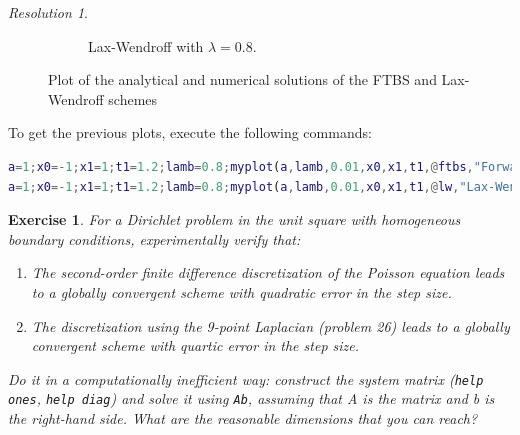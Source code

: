 \documentclass[10pt,a4paper]{article}
\newtheorem{exercici}{Exercise}
\theoremstyle{definition}
\theoremstyle{remark}
\newtheorem*{res}{Resolution}
\begin{document}
\begin{res}
\begin{figure}[!ht]
\begin{subfigure}{0.49\textwidth}
      \caption{Lax-Wendroff with $\lambda=0.8$.}
    \end{subfigure}
    \caption{Plot of the analytical and numerical solutions of the FTBS and Lax-Wendroff schemes}
  \end{figure}

  To get the previous plots, execute the following commands:
  \begin{lstlisting}[language=Matlab]
a=1;x0=-1;x1=1;t1=1.2;lamb=0.8;myplot(a,lamb,0.01,x0,x1,t1,@ftbs,"Forward-Time, Backward-Space");
a=1;x0=-1;x1=1;t1=1.2;lamb=0.8;myplot(a,lamb,0.01,x0,x1,t1,@lw,"Lax-Wendroff");
\end{lstlisting}
\end{res}
\newpage
\setcounter{exercici}{27}
\begin{exercici}
  For a Dirichlet problem in the unit square with homogeneous boundary conditions, experimentally verify that:
  \begin{enumerate}
    \item The second-order finite difference discretization of the Poisson equation leads to a globally convergent scheme with quadratic error in the step size.
    \item The discretization using the 9-point Laplacian (problem 26) leads to a globally convergent scheme with quartic error in the step size.
  \end{enumerate}
  Do it in a computationally inefficient way: construct the system matrix (\texttt{help ones}, \texttt{help diag}) and solve it using \texttt{Ab}, assuming that A is the matrix and b is the right-hand side. What are the reasonable dimensions that you can reach?
\end{exercici}
\end{document}
